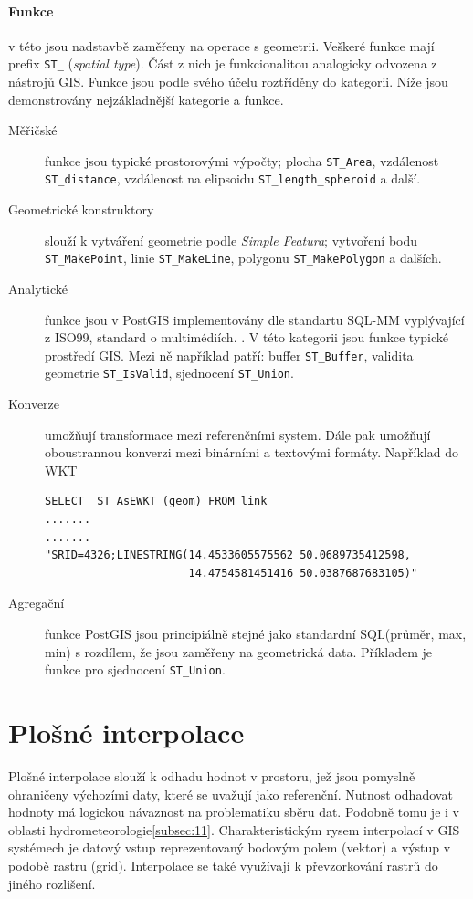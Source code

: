 \documentclass[a4paper,12pt]{report}
\begin{document}
\paragraph*{Funkce} v této jsou nadstavbě zaměřeny na operace s geometrii. Veškeré funkce mají prefix \texttt{ST\_} (\textit{spatial type}). Část z nich je funkcionalitou analogicky odvozena z nástrojů GIS. Funkce jsou podle svého účelu roztříděny do kategorii. Níže jsou demonstrovány nejzákladnější kategorie a funkce.
\begin{description}
\item[Měřičské] funkce jsou typické prostorovými výpočty; plocha \texttt{ST\_Area}, vzdálenost \texttt{ST\_distance}, vzdálenost na elipsoidu \texttt{ST\_length\_spheroid} a další. 
\item[Geometrické konstruktory] slouží k vytváření geometrie podle \textit{Simple Featura}; vytvoření bodu \texttt{ST\_MakePoint}, linie \texttt{ST\_MakeLine}, polygonu \texttt{ST\_MakePolygon} a dalších.
\item[Analytické] funkce jsou v PostGIS implementovány dle standartu SQL-MM  vyplývající z ISO99, standard o multimédiích. \cite{sqlmm}. V této kategorii jsou funkce typické prostředí GIS. Mezi ně například patří: buffer \texttt{ST\_Buffer}, validita geometrie \texttt{ST\_IsValid}, sjednocení \texttt{ST\_Union}.
\item[Konverze] umožňují transformace mezi referenčními system. Dále pak umožňují oboustrannou konverzi mezi binárními a textovými formáty. Například do \acs{WKT} 

\begin{verbatim}
SELECT  ST_AsEWKT (geom) FROM link
.......
.......
"SRID=4326;LINESTRING(14.4533605575562 50.0689735412598,
                      14.4754581451416 50.0387687683105)"
\end{verbatim}

\item[Agregační] funkce PostGIS jsou principiálně stejné jako standardní SQL(průměr, max, min) s rozdílem, že jsou zaměřeny na geometrická data. Příkladem je funkce pro sjednocení \texttt{ST\_Union}.
\end{description}












\setcounter{footnote}{1}
\section{Plošné interpolace }
Plošné interpolace slouží k odhadu hodnot v prostoru, jež jsou pomyslně ohraničeny výchozími daty, které se uvažují jako referenční. Nutnost odhadovat hodnoty má logickou návaznost na problematiku sběru dat.  Podobně tomu je i v oblasti hydrometeorologie\ref{subsec:11}. Charakteristickým rysem interpolací v GIS systémech je datový vstup reprezentovaný bodovým polem (vektor) a výstup v podobě rastru (grid). Interpolace se také využívají k převzorkování rastrů do jiného rozlišení.
\end{document}
